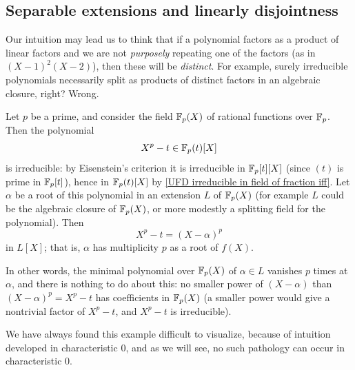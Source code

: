 \subsection{Separable extensions and linearly disjointness}
Our intuition may lead us to think that if a polynomial factors as a product of linear factors and we are not \textit{purposely} repeating one of the factors (as in $(X-1)^2(X-2)$), then these will be \textit{distinct}. For example, surely irreducible polynomials necessarily split as products of distinct factors in an algebraic closure, right? Wrong.
\begin{example}\label{irr insepara eg}
Let $p$ be a prime, and consider the field $\mathbb{F}_p(X)$ of rational functions over $\mathbb{F}_p$. Then the polynomial
\[X^p-t\in \mathbb{F}_p(t)[X]\]
is irreducible: by Eisenstein's criterion it is irreducible in $\mathbb{F}_p[t][X]$ (since $(t)$ is prime in $\mathbb{F}_p[t]$), hence in $\mathbb{F}_p(t)[X]$ by \cref{UFD irreducible in field of fraction iff}. Let $\alpha$ be a root of this polynomial in an extension $L$ of $\mathbb{F}_p(X)$ (for example $L$ could be the algebraic closure of $\mathbb{F}_p(X)$, or more modestly a splitting field for the polynomial). Then
\[X^p-t=(X-\alpha)^p\]
in $L[X]$; that is, $\alpha$ has multiplicity $p$ as a root of $f(X)$.\par
In other words, the minimal polynomial over $\mathbb{F}_p(X)$ of $\alpha\in L$ vanishes $p$ times at $\alpha$, and there is nothing to do about this: no smaller power of $(X-\alpha)$ than $(X-\alpha)^p=X^p-t$ has coefficients in $\mathbb{F}_p(X)$ (a smaller power would give a nontrivial factor of $X^p-t$, and $X^p-t$ is irreducible).
\end{example}
We have always found this example difficult to visualize, because of intuition developed in characteristic $0$, and as we will see, no such pathology can occur in characteristic $0$.
